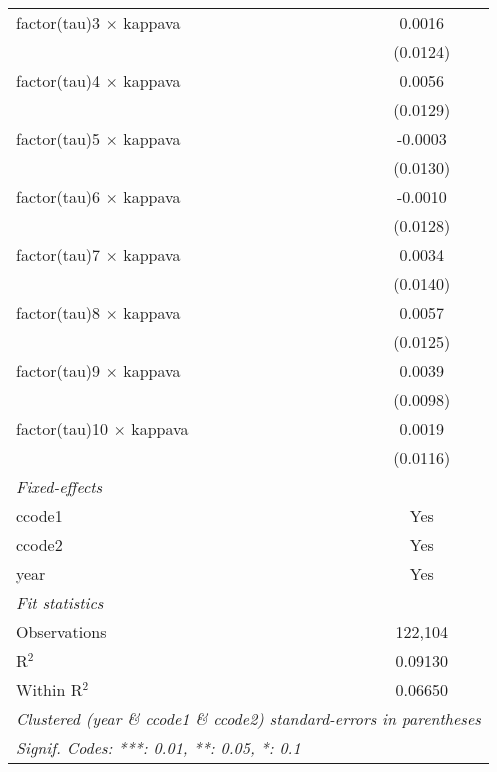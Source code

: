 \begin{tabular}{lc}
   factor(tau)3 $\times$ kappava   & 0.0016\\   
                                   & (0.0124)\\   
   factor(tau)4 $\times$ kappava   & 0.0056\\   
                                   & (0.0129)\\   
   factor(tau)5 $\times$ kappava   & -0.0003\\   
                                   & (0.0130)\\   
   factor(tau)6 $\times$ kappava   & -0.0010\\   
                                   & (0.0128)\\   
   factor(tau)7 $\times$ kappava   & 0.0034\\   
                                   & (0.0140)\\   
   factor(tau)8 $\times$ kappava   & 0.0057\\   
                                   & (0.0125)\\   
   factor(tau)9 $\times$ kappava   & 0.0039\\   
                                   & (0.0098)\\   
   factor(tau)10 $\times$ kappava  & 0.0019\\   
                                   & (0.0116)\\   
   \midrule
   \emph{Fixed-effects}\\
   ccode1                          & Yes\\  
   ccode2                          & Yes\\  
   year                            & Yes\\  
   \midrule
   \emph{Fit statistics}\\
   Observations                    & 122,104\\  
   R$^2$                           & 0.09130\\  
   Within R$^2$                    & 0.06650\\  
   \midrule \midrule
   \multicolumn{2}{l}{\emph{Clustered (year \& ccode1 \& ccode2) standard-errors in parentheses}}\\
   \multicolumn{2}{l}{\emph{Signif. Codes: ***: 0.01, **: 0.05, *: 0.1}}\\
\end{tabular}
\par\endgroup



